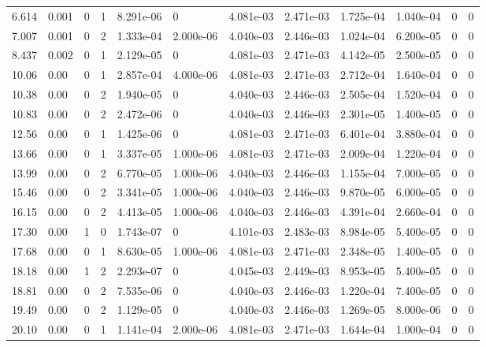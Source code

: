\documentclass[preview]{standalone}
\begin{document}
{{\begin{tabular}{L{1.2cm}C{1.2cm} C{0.3cm}C{0.5cm} C{1.4cm}C{1.4cm} C{1.4cm}C{1.4cm} C{1.6cm}C{1.6cm} C{1.6cm}C{1.6cm}}
  6.614  &  0.001  & 0     &  1 &  8.291e-06  & 0  &  4.081e-03&   2.471e-03& 1.725e-04 & 1.040e-04   &  0 & 0  \\ 
  7.007  &  0.001  & 0     &  2 &  1.333e-04  & 2.000e-06  &  4.040e-03&   2.446e-03& 1.024e-04 & 6.200e-05   &  0 & 0  \\ 
  8.437  &  0.002  & 0     &  1 &  2.129e-05  & 0  &  4.081e-03&   2.471e-03& 4.142e-05 & 2.500e-05   &  0 & 0  \\ 
  10.06  &  0.00  & 0     &  1 &  2.857e-04  & 4.000e-06  &  4.081e-03&   2.471e-03& 2.712e-04 & 1.640e-04   &  0 & 0  \\ 
  10.38  &  0.00  & 0     &  2 &  1.940e-05  & 0  &  4.040e-03&   2.446e-03& 2.505e-04 & 1.520e-04   &  0 & 0  \\ 
  10.83  &  0.00  & 0     &  2 &  2.472e-06  & 0  &  4.040e-03&   2.446e-03& 2.301e-05 & 1.400e-05   &  0 & 0  \\ 
  12.56  &  0.00  & 0     &  1 &  1.425e-06  & 0  &  4.081e-03&   2.471e-03& 6.401e-04 & 3.880e-04   &  0 & 0  \\ 
  13.66  &  0.00  & 0     &  1 &  3.337e-05  & 1.000e-06  &  4.081e-03&   2.471e-03& 2.009e-04 & 1.220e-04   &  0 & 0  \\ 
  13.99  &  0.00  & 0     &  2 &  6.770e-05  & 1.000e-06  &  4.040e-03&   2.446e-03& 1.155e-04 & 7.000e-05   &  0 & 0  \\ 
  15.46  &  0.00  & 0     &  2 &  3.341e-05  & 1.000e-06  &  4.040e-03&   2.446e-03& 9.870e-05 & 6.000e-05   &  0 & 0  \\ 
  16.15  &  0.00  & 0     &  2 &  4.413e-05  & 1.000e-06  &  4.040e-03&   2.446e-03& 4.391e-04 & 2.660e-04   &  0 & 0  \\ 
  17.30  &  0.00  & 1     &  0 &  1.743e-07  & 0  &  4.101e-03&   2.483e-03& 8.984e-05 & 5.400e-05   &  0 & 0  \\ 
  17.68  &  0.00  & 0     &  1 &  8.630e-05  & 1.000e-06  &  4.081e-03&   2.471e-03& 2.348e-05 & 1.400e-05   &  0 & 0  \\ 
  18.18  &  0.00  & 1     &  2 &  2.293e-07  & 0  &  4.045e-03&   2.449e-03& 8.953e-05 & 5.400e-05   &  0 & 0  \\ 
  18.81  &  0.00  & 0     &  2 &  7.535e-06  & 0  &  4.040e-03&   2.446e-03& 1.220e-04 & 7.400e-05   &  0 & 0  \\ 
  19.49  &  0.00  & 0     &  2 &  1.129e-05  & 0  &  4.040e-03&   2.446e-03& 1.269e-05 & 8.000e-06   &  0 & 0  \\ 
  20.10  &  0.00  & 0     &  1 &  1.141e-04  & 2.000e-06  &  4.081e-03&   2.471e-03& 1.644e-04 & 1.000e-04   &  0 & 0  \\ 

\end{tabular}}}
\end{document}
